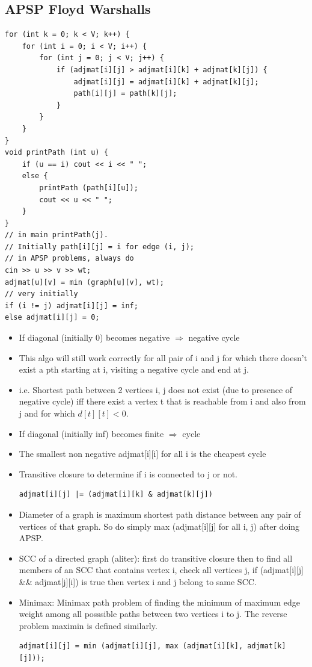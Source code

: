 \documentclass[8pt, a4paper, oneside, twocolumn]{extarticle}
\begin{document}
\subsection{APSP Floyd Warshalls}
\begin{verbatim}
for (int k = 0; k < V; k++) {
    for (int i = 0; i < V; i++) {
        for (int j = 0; j < V; j++) {
            if (adjmat[i][j] > adjmat[i][k] + adjmat[k][j]) {
                adjmat[i][j] = adjmat[i][k] + adjmat[k][j];
                path[i][j] = path[k][j];
            }
        }
    }
}
void printPath (int u) {
    if (u == i) cout << i << " ";
    else {
        printPath (path[i][u]);
        cout << u << " ";
    }
}
// in main printPath(j).
// Initially path[i][j] = i for edge (i, j);
// in APSP problems, always do 
cin >> u >> v >> wt;
adjmat[u][v] = min (graph[u][v], wt);
// very initially
if (i != j) adjmat[i][j] = inf;
else adjmat[i][j] = 0;
\end{verbatim}
\begin{itemize}
    \item If diagonal (initially 0) becomes negative $\Rightarrow$ negative cycle
    \item This algo will still work correctly for all pair of i and j for which there doesn't exist a pth starting at i, visiting a negative cycle and end at j.
    \item i.e. Shortest path between 2 vertices i, j does not exist (due to presence of negative cycle) iff there exist a vertex t that is reachable from i and also from j and for which $d[t][t] < 0$.
    \item If diagonal (initially inf) becomes finite $\Rightarrow$ cycle
    \item The smallest non negative adjmat[i][i] for all i is the cheapest cycle
    \item Transitive closure to determine if i is connected to j or not.
    \begin{verbatim}
adjmat[i][j] |= (adjmat[i][k] & adjmat[k][j])
    \end{verbatim}
    \item Diameter of a graph is maximum shortest path distance between any pair of vertices of that graph. So do simply max (adjmat[i][j] for all i, j) after doing APSP.
    \item SCC of a directed graph (aliter): first do transitive closure then to find all members of an SCC that contains vertex i, check all vertices j, if (adjmat[i][j] \&\& adjmat[j][i]) is true then vertex i and j belong to same SCC.
    \item Minimax: Minimax path problem of finding the minimum of maximum edge weight among all posssible paths between two vertices i to j. The reverse problem maximin is defined similarly.
    \begin{verbatim}
adjmat[i][j] = min (adjmat[i][j], max (adjmat[i][k], adjmat[k][j]));
    \end{verbatim}
\end{itemize}
\end{document}
